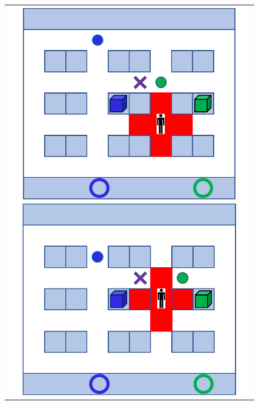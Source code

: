 \begin{figure}[htbp]
  \begin{center}
    \begin{tabular}{c}

      \begin{minipage}{0.5\hsize}
        \begin{center}
          \includegraphics[scale=0.2]{figures/case_Method2_1.pdf}
          \caption{}%
          \label{fig:case_Method2_1}
        \end{center}
      \end{minipage}

      \begin{minipage}{0.5\hsize}
        \begin{center}
          \includegraphics[scale=0.2]{figures/case_Method2_2.pdf}
          \caption{}
          \label{fig:case_Method2_2}
        \end{center}
      \end{minipage}
      

\end{tabular}
\end{center}
\end{figure}
